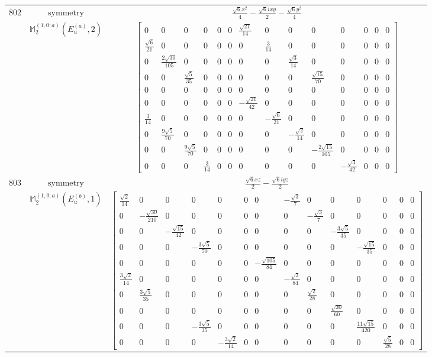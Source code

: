 \documentclass[fleqn,8pt,landscape]{jsarticle}
\begin{document}
\begin{longtable}{ccc}
$ 802 $ & $ \text{symmetry} $ & $ \frac{\sqrt{6} x^{2}}{4} - \frac{\sqrt{6} i x y}{2} - \frac{\sqrt{6} y^{2}}{4} $ \\
$  $ & $ \mathbb{M}_{2}^{(1,0;a)}(E_{u}^{(a)},2) $ & $ \begin{bmatrix} 0 & 0 & 0 & 0 & 0 & 0 & \frac{\sqrt{21}}{14} & 0 & 0 & 0 & 0 & 0 & 0 & 0 \\ \frac{\sqrt{6}}{21} & 0 & 0 & 0 & 0 & 0 & 0 & \frac{3}{14} & 0 & 0 & 0 & 0 & 0 & 0 \\ 0 & \frac{2 \sqrt{30}}{105} & 0 & 0 & 0 & 0 & 0 & 0 & \frac{\sqrt{3}}{14} & 0 & 0 & 0 & 0 & 0 \\ 0 & 0 & \frac{\sqrt{5}}{35} & 0 & 0 & 0 & 0 & 0 & 0 & \frac{\sqrt{15}}{70} & 0 & 0 & 0 & 0 \\ 0 & 0 & 0 & 0 & 0 & 0 & 0 & 0 & 0 & 0 & 0 & 0 & 0 & 0 \\ 0 & 0 & 0 & 0 & 0 & 0 & - \frac{\sqrt{21}}{42} & 0 & 0 & 0 & 0 & 0 & 0 & 0 \\ \frac{3}{14} & 0 & 0 & 0 & 0 & 0 & 0 & - \frac{\sqrt{6}}{21} & 0 & 0 & 0 & 0 & 0 & 0 \\ 0 & \frac{9 \sqrt{5}}{70} & 0 & 0 & 0 & 0 & 0 & 0 & - \frac{\sqrt{2}}{14} & 0 & 0 & 0 & 0 & 0 \\ 0 & 0 & \frac{9 \sqrt{5}}{70} & 0 & 0 & 0 & 0 & 0 & 0 & - \frac{2 \sqrt{15}}{105} & 0 & 0 & 0 & 0 \\ 0 & 0 & 0 & \frac{3}{14} & 0 & 0 & 0 & 0 & 0 & 0 & - \frac{\sqrt{3}}{42} & 0 & 0 & 0 \end{bmatrix} $ \\ \hline
$ 803 $ & $ \text{symmetry} $ & $ \frac{\sqrt{6} x z}{2} - \frac{\sqrt{6} i y z}{2} $ \\
$  $ & $ \mathbb{M}_{2}^{(1,0;a)}(E_{u}^{(b)},1) $ & $ \begin{bmatrix} \frac{\sqrt{2}}{14} & 0 & 0 & 0 & 0 & 0 & 0 & - \frac{\sqrt{3}}{7} & 0 & 0 & 0 & 0 & 0 & 0 \\ 0 & - \frac{\sqrt{30}}{210} & 0 & 0 & 0 & 0 & 0 & 0 & - \frac{\sqrt{3}}{7} & 0 & 0 & 0 & 0 & 0 \\ 0 & 0 & - \frac{\sqrt{15}}{42} & 0 & 0 & 0 & 0 & 0 & 0 & - \frac{3 \sqrt{5}}{35} & 0 & 0 & 0 & 0 \\ 0 & 0 & 0 & - \frac{3 \sqrt{5}}{70} & 0 & 0 & 0 & 0 & 0 & 0 & - \frac{\sqrt{15}}{35} & 0 & 0 & 0 \\ 0 & 0 & 0 & 0 & 0 & 0 & - \frac{\sqrt{105}}{84} & 0 & 0 & 0 & 0 & 0 & 0 & 0 \\ \frac{3 \sqrt{2}}{14} & 0 & 0 & 0 & 0 & 0 & 0 & - \frac{\sqrt{3}}{84} & 0 & 0 & 0 & 0 & 0 & 0 \\ 0 & \frac{3 \sqrt{5}}{35} & 0 & 0 & 0 & 0 & 0 & 0 & \frac{\sqrt{2}}{28} & 0 & 0 & 0 & 0 & 0 \\ 0 & 0 & 0 & 0 & 0 & 0 & 0 & 0 & 0 & \frac{\sqrt{30}}{60} & 0 & 0 & 0 & 0 \\ 0 & 0 & 0 & - \frac{3 \sqrt{5}}{35} & 0 & 0 & 0 & 0 & 0 & 0 & \frac{11 \sqrt{15}}{420} & 0 & 0 & 0 \\ 0 & 0 & 0 & 0 & - \frac{3 \sqrt{2}}{14} & 0 & 0 & 0 & 0 & 0 & 0 & \frac{\sqrt{5}}{28} & 0 & 0 \end{bmatrix} $ \\ \hline

\end{longtable}
\end{document}
